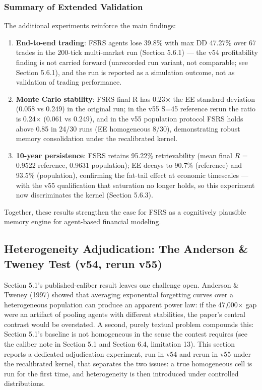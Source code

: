 \documentclass[11pt]{article}
\begin{document}
\subsubsection{Summary of Extended Validation}
The additional experiments reinforce the main findings:

\begin{enumerate}
\item \textbf{End-to-end trading}: FSRS agents lose 39.8\% with max DD 47.27\% over 67 trades in the 200-tick multi-market run (Section 5.6.1) --- the v54 profitability finding is not carried forward (unrecorded run variant, not comparable; see Section 5.6.1), and the run is reported as a simulation outcome, not as validation of trading performance.
\item \textbf{Monte Carlo stability}: FSRS final R has 0.23$\times$ the EE standard deviation (0.058 vs 0.249) in the original run; in the v55 S=45 reference rerun the ratio is 0.24$\times$ (0.061 vs 0.249), and in the v55 population protocol FSRS holds above 0.85 in 24/30 runs (EE homogeneous 8/30), demonstrating robust memory consolidation under the recalibrated kernel.
\item \textbf{10-year persistence}: FSRS retains 95.22\% retrievability (mean final $R$ = 0.9522 reference, 0.9631 population); EE decays to 90.7\% (reference) and 93.5\% (population), confirming the fat-tail effect at economic timescales --- with the v55 qualification that saturation no longer holds, so this experiment now discriminates the kernel (Section 5.6.3).
\end{enumerate}

Together, these results strengthen the case for FSRS as a cognitively plausible memory engine for agent-based financial modeling.

\subsection{Heterogeneity Adjudication: The Anderson \& Tweney Test (v54, rerun v55)}
Section 5.1's published-caliber result leaves one challenge open. Anderson \& Tweney (1997) showed that averaging exponential forgetting curves over a heterogeneous population can produce an apparent power law: if the 47,000$\times$ gap were an artifact of pooling agents with different stabilities, the paper's central contrast would be overstated. A second, purely textual problem compounds this: Section 5.1's baseline is not homogeneous in the sense the contest requires (see the caliber note in Section 5.1 and Section 6.4, limitation 13). This section reports a dedicated adjudication experiment, run in v54 and rerun in v55 under the recalibrated kernel, that separates the two issues: a true homogeneous cell is run for the first time, and heterogeneity is then introduced under controlled distributions.
\end{document}
